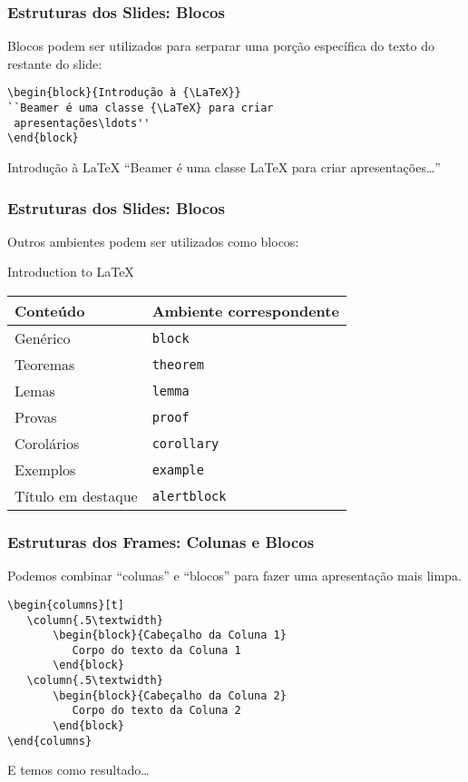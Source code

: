 \begin{frame}[fragile]
\frametitle{Estruturas dos Slides: Blocos}
Blocos podem ser utilizados para serparar uma porção específica do texto do restante do slide:

{\small
\begin{verbatim}
\begin{block}{Introdução à {\LaTeX}}
``Beamer é uma classe {\LaTeX} para criar
 apresentações\ldots''
\end{block}
\end{verbatim}
}

\begin{block}{Introdução à {\LaTeX}}
``Beamer é uma classe {\LaTeX} para criar apresentações\ldots''
\end{block}

\end{frame}


\begin{frame}[fragile]
\frametitle{Estruturas dos Slides: Blocos}
Outros ambientes podem ser utilizados como blocos:


\begin{block}{Introduction to {\LaTeX}}
\begin{tabular}{l|l}
\textbf{Conteúdo} & \textbf{Ambiente correspondente} \\
\hline
Genérico & \texttt{block}\\
Teoremas & \texttt{theorem}\\
Lemas & \texttt{lemma}\\
Provas & \texttt{proof}\\
Corolários & \texttt{corollary}\\
Exemplos & \texttt{example}\\
Título em destaque & \texttt{alertblock}\\
\end{tabular}
\end{block}

\end{frame}

\begin{frame}[fragile]
\frametitle{Estruturas dos Frames: Colunas e Blocos}

Podemos combinar ``colunas'' e ``blocos'' para fazer uma apresentação mais limpa.

\begin{verbatim}
\begin{columns}[t]
   \column{.5\textwidth}
       \begin{block}{Cabeçalho da Coluna 1}
          Corpo do texto da Coluna 1
       \end{block}
   \column{.5\textwidth}
       \begin{block}{Cabeçalho da Coluna 2}
          Corpo do texto da Coluna 2
       \end{block}
\end{columns}
\end{verbatim}

E temos como resultado\ldots
\end{frame}


